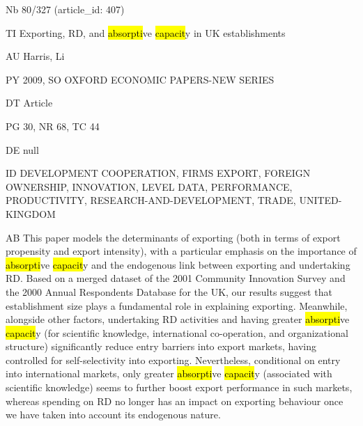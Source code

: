 \documentclass[a4paper]{article}
\begin{document}
\vspace*{-2cm}
Nb \tabto{0cm}80/327 (article\_id: 407)\par
TI \tabto{0cm}Exporting, RD, and \hl{absorpti}ve \hl{capacit}y in UK establishments\par
AU \tabto{0cm}Harris, Li\par
PY \tabto{0cm}2009, SO OXFORD ECONOMIC PAPERS-NEW SERIES\par
DT \tabto{0cm}Article\par
PG \tabto{0cm}30, NR 68, TC 44\par
DE \tabto{0cm}null\par
ID \tabto{0cm}DEVELOPMENT COOPERATION, FIRMS EXPORT, FOREIGN OWNERSHIP, INNOVATION, LEVEL DATA, PERFORMANCE, PRODUCTIVITY, RESEARCH-AND-DEVELOPMENT, TRADE, UNITED-KINGDOM\par
AB \tabto{0cm}This paper models the determinants of exporting (both in terms of export propensity and export intensity), with a particular emphasis on the importance of \hl{absorpti}ve \hl{capacit}y and the endogenous link between exporting and undertaking RD. Based on a merged dataset of the 2001 Community Innovation Survey and the 2000 Annual Respondents Database for the UK, our results suggest that establishment size plays a fundamental role in explaining exporting. Meanwhile, alongside other factors, undertaking RD activities and having greater \hl{absorpti}ve \hl{capacit}y (for scientific knowledge, international co-operation, and organizational structure) significantly reduce entry barriers into export markets, having controlled for self-selectivity into exporting. Nevertheless, conditional on entry into international markets, only greater \hl{absorpti}ve \hl{capacit}y (associated with scientific knowledge) seems to further boost export performance in such markets, whereas spending on RD no longer has an impact on exporting behaviour once we have taken into account its endogenous nature.\par
\clearpage
\end{document}
